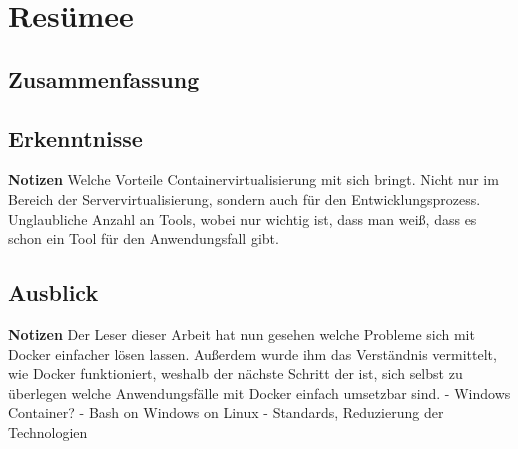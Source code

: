 
\chapter{Resümee}
\section{Zusammenfassung}

\section{Erkenntnisse}
\textbf{Notizen}
Welche Vorteile Containervirtualisierung mit sich bringt. Nicht nur im Bereich der Servervirtualisierung, sondern auch für den Entwicklungsprozess.
Unglaubliche Anzahl an Tools, wobei nur wichtig ist, dass man weiß, dass es schon ein Tool für den Anwendungsfall gibt.

\section{Ausblick}
\textbf{Notizen}
Der Leser dieser Arbeit hat nun gesehen welche Probleme sich mit Docker einfacher lösen lassen. Außerdem wurde ihm das Verständnis vermittelt, wie Docker funktioniert, weshalb der nächste Schritt der ist, sich selbst zu überlegen welche Anwendungsfälle mit Docker einfach umsetzbar sind.
- Windows Container?
- Bash on Windows on Linux
- Standards, Reduzierung der Technologien
